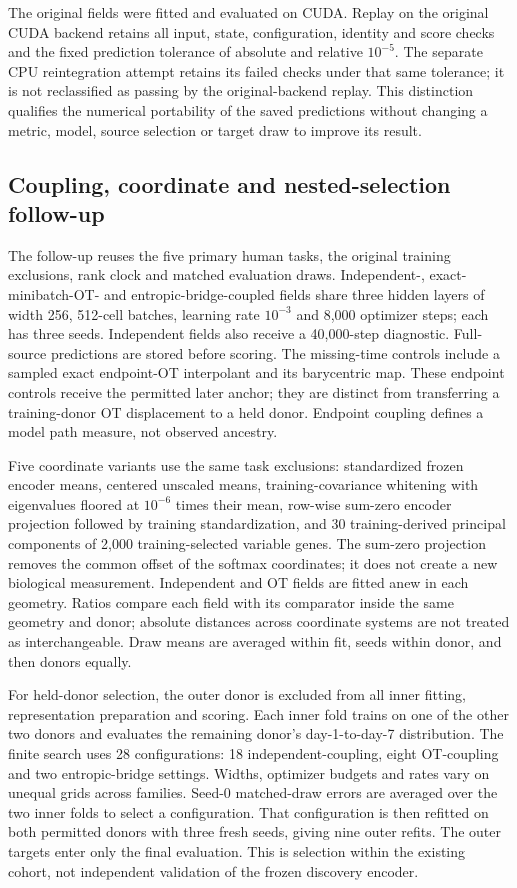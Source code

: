 The original fields were fitted and evaluated on CUDA. Replay on the original CUDA backend retains all input, state, configuration, identity and score checks and the fixed prediction tolerance of absolute and relative $10^{-5}$. The separate CPU reintegration attempt retains its failed checks under that same tolerance; it is not reclassified as passing by the original-backend replay. This distinction qualifies the numerical portability of the saved predictions without changing a metric, model, source selection or target draw to improve its result.
\subsection{Coupling, coordinate and nested-selection follow-up}
The follow-up reuses the five primary human tasks, the original training exclusions, rank clock and matched evaluation draws. Independent-, exact-minibatch-OT- and entropic-bridge-coupled fields share three hidden layers of width 256, 512-cell batches, learning rate $10^{-3}$ and 8,000 optimizer steps; each has three seeds. Independent fields also receive a 40,000-step diagnostic. Full-source predictions are stored before scoring. The missing-time controls include a sampled exact endpoint-OT interpolant and its barycentric map. These endpoint controls receive the permitted later anchor; they are distinct from transferring a training-donor OT displacement to a held donor. Endpoint coupling defines a model path measure, not observed ancestry.

Five coordinate variants use the same task exclusions: standardized frozen encoder means, centered unscaled means, training-covariance whitening with eigenvalues floored at $10^{-6}$ times their mean, row-wise sum-zero encoder projection followed by training standardization, and 30 training-derived principal components of 2,000 training-selected variable genes. The sum-zero projection removes the common offset of the softmax coordinates; it does not create a new biological measurement. Independent and OT fields are fitted anew in each geometry. Ratios compare each field with its comparator inside the same geometry and donor; absolute distances across coordinate systems are not treated as interchangeable. Draw means are averaged within fit, seeds within donor, and then donors equally.

For held-donor selection, the outer donor is excluded from all inner fitting, representation preparation and scoring. Each inner fold trains on one of the other two donors and evaluates the remaining donor's day-1-to-day-7 distribution. The finite search uses 28 configurations: 18 independent-coupling, eight OT-coupling and two entropic-bridge settings. Widths, optimizer budgets and rates vary on unequal grids across families. Seed-0 matched-draw errors are averaged over the two inner folds to select a configuration. That configuration is then refitted on both permitted donors with three fresh seeds, giving nine outer refits. The outer targets enter only the final evaluation. This is selection within the existing cohort, not independent validation of the frozen discovery encoder.

